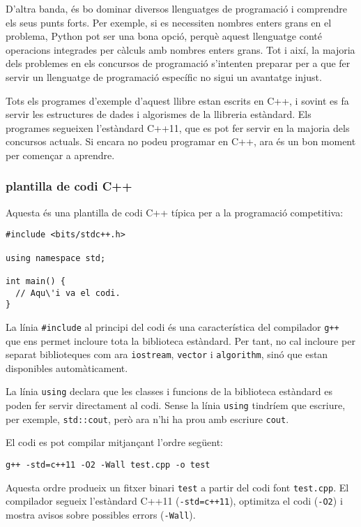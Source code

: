D'altra banda, és bo
dominar diversos llenguatges de programaci\'o i comprendre
els seus punts forts.
Per exemple, si es necessiten nombres enters grans
en el problema,
Python pot ser una bona opció, perquè aquest
llenguatge
conté operacions integrades per
càlculs amb nombres enters grans.
Tot i així, la majoria dels problemes en els concursos de programació
s'intenten preparar per a que
fer servir un llenguatge de programació específic
no sigui un avantatge injust.

Tots els programes d'exemple d'aquest llibre estan escrits en C++,
i sovint es fa servir les estructures de dades i algorismes de
la llibreria estàndard.
Els programes segueixen l'estàndard C++11,
que es pot fer servir en la majoria dels concursos actuals.
Si encara no podeu programar en C++,
ara és un bon moment per començar a aprendre.

\subsubsection{plantilla de codi C++}

Aquesta \'es una plantilla de codi C++ típica per a la
programació competitiva:

\begin{lstlisting}
#include <bits/stdc++.h>

using namespace std;

int main() {
  // Aqu\'i va el codi.
}
\end{lstlisting}

La línia \texttt{\#include} al principi
del codi és una característica del compilador \texttt{g++}
que ens permet incloure tota la biblioteca estàndard.
Per tant, no cal incloure per separat
biblioteques com ara \texttt{iostream},
\texttt{vector} i \texttt{algorithm},
sinó que estan disponibles automàticament.

La línia \texttt{using} declara
que les classes i funcions
de la biblioteca estàndard es poden fer servir directament
al codi.
Sense la línia \texttt{using} tindríem
que escriure, per exemple, \texttt{std::cout},
però ara n'hi ha prou amb escriure \texttt{cout}.

El codi es pot compilar mitjançant l'ordre següent:

\begin{lstlisting}
g++ -std=c++11 -O2 -Wall test.cpp -o test
\end{lstlisting}

Aquesta ordre produeix un fitxer binari \texttt{test}
a partir del codi font \texttt{test.cpp}.
El compilador segueix l'estàndard C++11
(\texttt{-std=c++11}),
optimitza el codi (\texttt{-O2})
i mostra avisos sobre possibles errors (\texttt{-Wall}).

